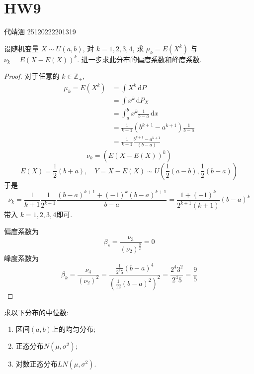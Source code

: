 \documentclass[../main.tex]{subfiles}
\begin{document}
\ifSubfilesClassLoaded{

    
    \setcounter{chapter}{8}
}{}

\chapter{ HW9 }
 代靖涵 25120222201319
\begin{exercise}{}{}
设随机变量 $X \sim U(a,b)$, 对 $k=1,2,3,4$, 求 $\mu_k = E(X^k)$ 与 $\nu_k = E(X - E(X))^k$. 进一步求此分布的偏度系数和峰度系数.
\end{exercise}

\begin{proof}
对于任意的  \(  k\in \mathbb{Z} _{+ }  \),       \[
  \begin{aligned}
   \mu _{k}=   E\left( X^{k} \right)&=  \int X^{k}\,\mathrm{d} P \\ 
      &= \int x^{k}\,\mathrm{d} P_{X}\\ 
       &=  \int_{a}^{b} x^{k} \frac{1 }{b-a }\,\mathrm{d} x \\ 
        &= \frac{1 }{k+ 1 } \left( b^{k+ 1}-a^{k+ 1} \right) \frac{1 }{b-a }\\ 
         &=\frac{1 }{k+ 1 }\frac{b^{k+ 1}-a^{k+ 1} }{\left( b-a \right)  }   
  \end{aligned} 
     \]  \[
     \nu _{k}= \left( E\left( X-E\left( X \right)  \right)^{k}  \right) 
     \] \[
     E\left( X \right)= \frac{1 }{2 }\left( b+ a \right),\quad Y= X-E\left( X \right)\sim     U\left( \frac{1 }{2 }\left( a-b \right),\frac{1 }{2 } \left( b-a \right)    \right)  
     \]于是 \[
     \nu _{k}= \frac{1 }{k+ 1 } \frac{1 }{2^{k+ 1} }\frac{\left( b-a \right)^{k+ 1}+ \left( -1 \right)^{k}\left( b-a \right)^{k+ 1}    }{ b-a}   = \frac{1+ \left( -1 \right)^{k}  }{2^{k+ 1}\left( k+ 1 \right)   } \left( b-a \right)^{k}  
     \]带入 \(  k= 1,2,3,4  \)即可.
     
     偏度系数为 \[
      \beta _{s} = \frac{\nu_3 }{ \left( \nu _2  \right)^{\frac{3 }{2 } }  }= 0
     \]峰度系数为 \[
     \beta _k = \frac{\nu _4  }{\left( \nu _2  \right)^{2}  }=\frac{ \frac{1 }{2^{4}5 }\left( b-a \right)^{4}    }{\left( \frac{1 }{12 }\left( b-a \right)^{2}   \right)^{2}  }= \frac{2^{4}3^{2} }{2^{4}5 }= \frac{9 }{5 } 
     \]
\end{proof}
\begin{exercise}{}{}
求以下分布的中位数:

\begin{enumerate}
    \item 区间$(a,b)$上的均匀分布;
    \item 正态分布$N(\mu,\sigma^2)$;
    \item 对数正态分布$LN(\mu,\sigma^2)$.
\end{enumerate}
\end{exercise}
\end{document}
